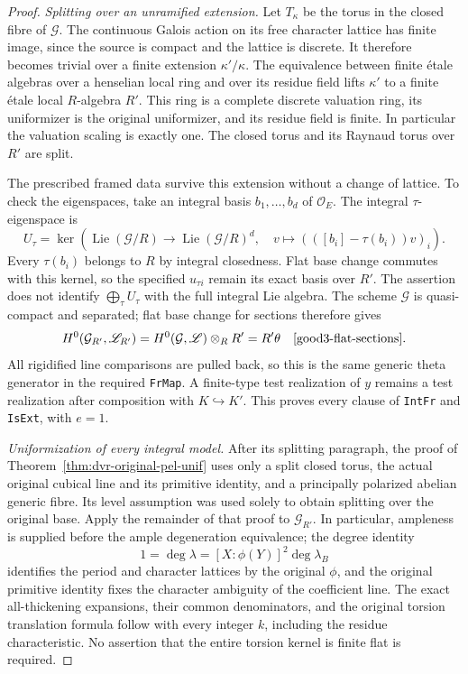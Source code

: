 \begin{proof}
\emph{Splitting over an unramified extension.}
Let $T_\kappa$ be the torus in the closed fibre of $\mathcal G$.
The continuous Galois action on its free character lattice has finite
image, since the source is compact and the lattice is discrete.
It therefore becomes trivial over a finite extension $\kappa'/\kappa$.
The equivalence between finite \'etale algebras over a henselian local
ring and over its residue field lifts $\kappa'$ to a finite \'etale
local $R$-algebra $R'$\cite{good3-henselian}.
This ring is a complete discrete valuation ring, its uniformizer is
the original uniformizer, and its residue field is finite.
In particular the valuation scaling is exactly one.  The closed torus
and its Raynaud torus over $R'$ are split.

The prescribed framed data survive this extension without a change of
lattice.  To check the eigenspaces, take an integral basis
$b_1,\ldots,b_d$ of $\mathcal O_E$.  The integral $\tau$-eigenspace is
\[
 U_\tau=\ker\left(\operatorname{Lie}(\mathcal G/R)
       \longrightarrow\operatorname{Lie}(\mathcal G/R)^d,\quad
       v\longmapsto(([b_i]-\tau(b_i))v)_i\right).
\]
Every $\tau(b_i)$ belongs to $R$ by integral closedness.  Flat base
change commutes with this kernel, so the specified $u_{\tau i}$ remain
its exact basis over $R'$.  The assertion does not identify
$\bigoplus_\tau U_\tau$ with the full integral Lie algebra.
The scheme $\mathcal G$ is quasi-compact and separated; flat base
change for sections therefore gives
\[
 H^0(\mathcal G_{R'},\mathscr L_{R'})
       =H^0(\mathcal G,\mathscr L)\otimes_R R'=R'\theta
       \quad\text{\cite{good3-flat-sections}}.
\]
All rigidified line comparisons are pulled back, so this is the same
generic theta generator in the required \texttt{FrMap}.  A finite-type
test realization of $y$ remains a test realization after composition
with $K\hookrightarrow K'$.  This proves every clause of
\texttt{IntFr} and \texttt{IsExt}, with $e=1$.

\emph{Uniformization of every integral model.}
After its splitting paragraph, the proof of
Theorem~\ref{thm:dvr-original-pel-unif} uses only a split closed torus,
the actual original cubical line and its primitive identity, and a
principally polarized abelian generic fibre.  Its level assumption
was used solely to obtain splitting over the original base.
Apply the remainder of that proof to $\mathcal G_{R'}$.
In particular, ampleness is supplied before the ample degeneration
equivalence; the degree identity
\[
       1=\deg\lambda=[X:\phi(Y)]^2\deg\lambda_B
\]
identifies the period and character lattices by the original
$\phi$, and the original primitive identity fixes the character
ambiguity of the coefficient line.  The exact all-thickening
expansions, their common denominators, and the original torsion
translation formula follow with every integer $k$, including the
residue characteristic.  No assertion that the entire torsion kernel
is finite flat is required.


\end{proof}

